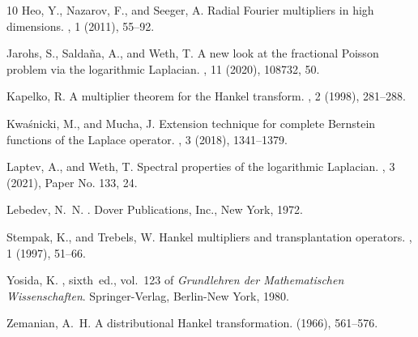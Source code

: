 \documentclass[a4paper,10pt, reqno]{amsart}
\theoremstyle{definition}
\theoremstyle{remark}
\numberwithin{equation}{section}
\begin{document}
\begin{thebibliography}{10}
{\sc Heo, Y., Nazarov, F., and Seeger, A.}
\newblock Radial {F}ourier multipliers in high dimensions.
, 1 (2011), 55--92.

{\sc Jarohs, S., Salda\~na, A., and Weth, T.}
\newblock A new look at the fractional {P}oisson problem via the logarithmic {L}aplacian.
, 11 (2020), 108732, 50.

{\sc Kapelko, R.}
\newblock A multiplier theorem for the {H}ankel transform.
, 2 (1998), 281--288.

{\sc Kwa\'snicki, M., and Mucha, J.}
\newblock Extension technique for complete {B}ernstein functions of the {L}aplace operator.
, 3 (2018), 1341--1379.

{\sc Laptev, A., and Weth, T.}
\newblock Spectral properties of the logarithmic {L}aplacian.
, 3 (2021), Paper No. 133, 24.

{\sc Lebedev, N.~N.}
.
\newblock Dover Publications, Inc., New York, 1972.

{\sc Stempak, K., and Trebels, W.}
\newblock Hankel multipliers and transplantation operators.
, 1 (1997), 51--66.

{\sc Yosida, K.}
, sixth~ed., vol.~123 of {\em Grundlehren der Mathematischen Wissenschaften}.
\newblock Springer-Verlag, Berlin-New York, 1980.

{\sc Zemanian, A.~H.}
\newblock A distributional {H}ankel transformation.
 (1966), 561--576.

\end{thebibliography}
\end{document}
